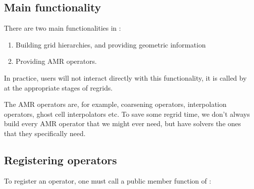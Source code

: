 \documentclass[letterpaper,10pt,english]{sphinxmanual}
\begin{document}
\subsection{Main functionality}
\label{\detokenize{AmrMesh:main-functionality}}
There are two main functionalities in :
\begin{enumerate}
%
\item {} 
Building grid hierarchies, and providing geometric information

\item {} 
Providing AMR operators.

\end{enumerate}

In practice, users will not interact directly with this functionality, it is called by  at the appropriate stages of regrids.

The AMR operators are, for example, coarsening operators, interpolation operators, ghost cell interpolators etc.
To save some regrid time, we don’t always build every AMR operator that we might ever need, but have solvers  the ones that they specifically need.


\subsection{Registering operators}
\label{\detokenize{AmrMesh:registering-operators}}
To register an operator, one must call a public member function of :

\begin{sphinxVerbatim}[commandchars=\\\{\},formatcom=\scriptsize]
      
\end{sphinxVerbatim}
\end{document}

